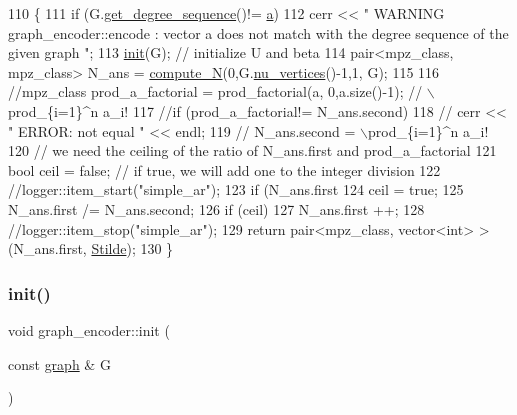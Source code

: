 \begin{DoxyCode}
110                                                                  \{
111   \textcolor{keywordflow}{if} (G.\hyperlink{classgraph_afdca627df7fb93a7d1d8a547f616e948}{get\_degree\_sequence}()!= \hyperlink{classgraph__encoder_a56eb5cf480ae5c2fca9f3a45f2ffd4f1}{a})
112     cerr << \textcolor{stringliteral}{" WARNING graph\_encoder::encode : vector a does not match with the degree sequence of the given
       graph "};
113   \hyperlink{classgraph__encoder_a6cfb6fca4bc50d4e5d267060a91f43c3}{init}(G); \textcolor{comment}{// initialize U and beta }
114   pair<mpz\_class, mpz\_class> N\_ans  = \hyperlink{classgraph__encoder_ae7273c47d6dab8367daa5ee6a9cdbc72}{compute\_N}(0,G.\hyperlink{classgraph_a70a6e0e4e0a874ab122405abd38f83cd}{nu\_vertices}()-1,1, G);
115 
116   \textcolor{comment}{//mpz\_class prod\_a\_factorial = prod\_factorial(a, 0,a.size()-1); // \(\backslash\)prod\_\{i=1\}^n a\_i!}
117   \textcolor{comment}{//if (prod\_a\_factorial!= N\_ans.second)}
118   \textcolor{comment}{//  cerr << " ERROR: not equal " << endl;}
119   \textcolor{comment}{// N\_ans.second = \(\backslash\)prod\_\{i=1\}^n a\_i!}
120   \textcolor{comment}{// we need the ceiling of the ratio of N\_ans.first and prod\_a\_factorial}
121   \textcolor{keywordtype}{bool} ceil = \textcolor{keyword}{false}; \textcolor{comment}{// if true, we will add one to the integer division}
122   \textcolor{comment}{//logger::item\_start("simple\_ar");}
123   \textcolor{keywordflow}{if} (N\_ans.first %
124     ceil = \textcolor{keyword}{true};
125   N\_ans.first /= N\_ans.second;
126   \textcolor{keywordflow}{if} (ceil)
127     N\_ans.first ++;
128   \textcolor{comment}{//logger::item\_stop("simple\_ar");}
129   \textcolor{keywordflow}{return} pair<mpz\_class, vector<int> > (N\_ans.first, \hyperlink{classgraph__encoder_a342688a3fdee511b7fae3f155cfb10cf}{Stilde});
130 \}
\end{DoxyCode}
\mbox{\label{classgraph__encoder_a6cfb6fca4bc50d4e5d267060a91f43c3}} 
\subsubsection{\texorpdfstring{init()}{init()}}
{\footnotesize\ttfamily void graph\+\_\+encoder\+::init (\begin{DoxyParamCaption}\item[{const \hyperlink{classgraph}{graph} \&}]{G }\end{DoxyParamCaption})}



